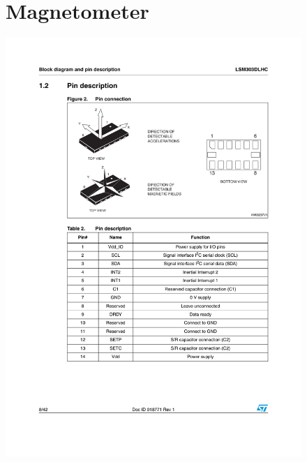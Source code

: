 \cleardoublepage
\begin{figure}
    \section{Magnetometer}\label{ds:magnetometer}
    \includegraphics[width=\textwidth,trim={1cm 0 0 0}]{Files/magnetometer_8}
\end{figure}
